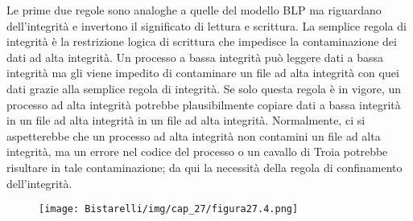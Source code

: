 Le prime due regole sono analoghe a quelle del modello BLP ma riguardano dell'integrità e invertono il significato di lettura e scrittura. La semplice regola di integrità è la restrizione logica di scrittura che impedisce la contaminazione dei dati ad alta integrità.
Un processo a bassa integrità può leggere dati a bassa integrità ma gli viene impedito di contaminare un file ad alta integrità con quei dati grazie alla semplice regola di integrità. Se solo questa regola è in vigore, un processo ad alta integrità potrebbe plausibilmente copiare dati a bassa integrità in un file ad alta integrità in un file ad alta integrità. Normalmente, ci si aspetterebbe che un processo ad alta integrità non contamini un file ad alta integrità, ma un errore nel codice del processo o un cavallo di Troia potrebbe risultare in tale contaminazione; da qui la necessità della regola di confinamento dell'integrità.

\begin{figure}[H]
	\centering
    \texttt{[image: Bistarelli/img/cap\_27/figura27.4.png]}
\end{figure}


